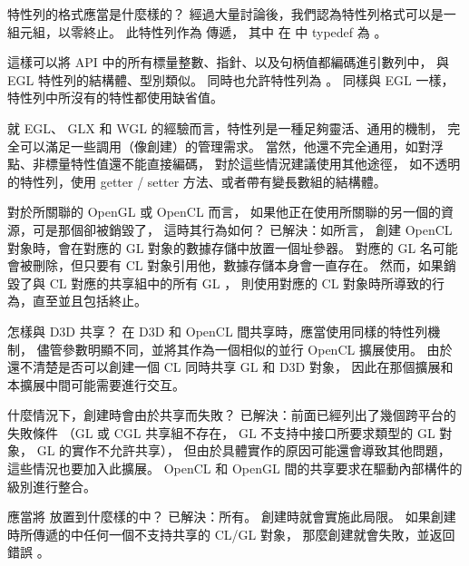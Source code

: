 \startQUESTION
特性列的格式應當是什麼樣的？
\stopQUESTION
\startANSWER
經過大量討論後，我們認為特性列格式可以是一組{}元組，以零終止。
此特性列作為  傳遞，
其中  在  中 typedef 為 。

這樣可以將 API 中的所有標量整數、指針、以及句柄值都編碼進引數列中，
與 EGL 特性列的結構體、型別類似。
同時也允許特性列為 。
同樣與 EGL 一樣，特性列中所沒有的特性都使用缺省值。

就 EGL、 GLX 和 WGL 的經驗而言，特性列是一種足夠靈活、通用的機制，
完全可以滿足一些調用（像創建）的管理需求。
當然，他還不完全通用，如對浮點、非標量特性值還不能直接編碼，
對於這些情況建議使用其他途徑，
如不透明的特性列，使用 getter / setter 方法、或者帶有變長數組的結構體。
\stopANSWER

\startQUESTION
對於所關聯的 OpenGL 或 OpenCL 而言，
如果他正在使用所關聯的另一個的資源，可是那個卻被銷毀了，
這時其行為如何？
\stopQUESTION
\startANSWER
已解決：如\insection[clShareGl]所言，
創建 OpenCL 對象時，會在對應的 GL 對象的數據存儲中放置一個址參器。
對應的 GL 名可能會被刪除，但只要有 CL 對象引用他，數據存儲本身會一直存在。
然而，如果銷毀了與 CL 對應的共享組中的所有 GL ，
則使用對應的 CL 對象時所導致的行為，直至並且包括終止。
\stopANSWER

\startQUESTION
怎樣與 D3D 共享？
\stopQUESTION
\startANSWER
在 D3D 和 OpenCL 間共享時，應當使用同樣的特性列機制，
儘管參數明顯不同，並將其作為一個相似的並行 OpenCL 擴展使用。
由於還不清楚是否可以創建一個 CL 同時共享 GL 和 D3D 對象，
因此在那個擴展和本擴展中間可能需要進行交互。
\stopANSWER

\startQUESTION
什麼情況下，創建時會由於共享而失敗？
\stopQUESTION
\startANSWER
已解決：前面已經列出了幾個跨平台的失敗條件
（GL 或 CGL 共享組不存在，
 GL 不支持\insection[clShareGl]中接口所要求類型的 GL 對象，
 GL 的實作不允許共享），
但由於具體實作的原因可能還會導致其他問題，
這些情況也要加入此擴展。
 OpenCL 和 OpenGL 間的共享要求在驅動內部構件的級別進行整合。
\stopANSWER

\startQUESTION
應當將  放置到什麼樣的中？
\stopQUESTION
\startANSWER
已解決：所有。
創建時就會實施此局限。
如果創建時所傳遞的中任何一個不支持共享的 CL/GL 對象，
那麼創建就會失敗，並返回錯誤 。
\stopANSWER

